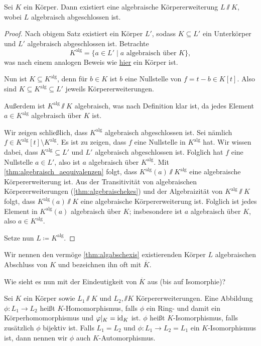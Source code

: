 \documentclass[12pt,a4paper]{scrartcl}
\begin{document}
\begin{satz}\label{thm:algabschexis}
	Sei $K$ ein Körper. Dann existiert eine algebraische Körpererweiterung $L\sslash K$, wobei $L$ algebraisch abgeschlossen ist.
\end{satz}
\begin{proof}
	Nach obigem Satz existiert ein Körper $L'$, sodass $K\subseteq L'$ ein Unterkörper und $L'$ algebraisch abgeschlossen ist. Betrachte
	\[K^{\text{alg}} = \{a\in L' \mid a\text{ algebraisch über } K\},\]
	was nach einem analogen Beweis wie \hyperref[enumi:IQalgkoerp]{hier} ein Körper ist.
	
	Nun ist $K\subseteq K^{\text{alg}}$, denn für $b\in K$ ist $b$ eine Nullstelle von $f = t-b\in K[t]$. Also sind $K\subseteq K^{\text{alg}}\subseteq L'$ jeweils Körpererweiterungen.
	
	Außerdem ist $K^{\text{alg}}\sslash K$ algebraisch, was nach Definition klar ist, da jedes Element $a\in K^{\text{alg}}$ algebraisch über $K$ ist.
	
	Wir zeigen schließlich, dass $K^{\text{alg}}$ algebraisch abgeschlossen ist. Sei nämlich $f\in K^{\text{alg}}[t]\setminus K^{\text{alg}}$. Es ist zu zeigen, dass $f$ eine Nullstelle in $K^{\text{alg}}$ hat. Wir wissen dabei, dass $K^{\text{alg}}\subseteq L'$ und $L'$ algebraisch abgeschlossen ist. Folglich hat $f$ eine Nullstelle $a\in L'$, also ist $a$ algebraisch über $K^{\text{alg}}$. Mit \cref{thm:algebraisch_aequivalenzen} folgt, dass $K^{\text{alg}}(a)\sslash K^{\text{alg}}$ eine algebraische Körpererweiterung ist. Aus der Transitivität von algebraischen Körpererweiterungen (\cref{thm:algebraischekes}) und der Algebraizität von $K^{\text{alg}}\sslash K$ folgt, dass $K^{\text{alg}}(a)\sslash K$  eine algebraische Körpererweiterung ist. Folglich ist jedes Element in $K^{\text{alg}}(a)$ algebraisch über $K$; insbesondere ist $a$ algebraisch über $K$, also $a\in K^{\text{alg}}$.
	
	Setze nun $L\coloneqq K^{\text{alg}}$.
\end{proof}

\begin{defi}
	Wir nennen den vermöge \cref{thm:algabschexis} existierenden Körper $L$ algebraischen Abschluss von $K$ und bezeichnen ihn oft mit $\overline{K}$.
\end{defi}
Wie sieht es nun mit der Eindeutigkeit von $\overline{K}$ aus (bis auf Isomorphie)?
\begin{defi}
	Sei $K$ ein Körper sowie $L_1\sslash K$ und $L_2, \sslash K$ Körpererweiterungen. Eine Abbildung $\phi\colon L_1\to L_2$ heißt $K$-Homomorphismus, falls $\phi$ ein Ring- und damit ein Körperhomomorphismus und $\varphi|_K = \operatorname{id}_K$ ist. $\phi$ heißt $K$-Isomorphismus, falls zusätzlich $\phi$ bijektiv ist. Falls $L_1 = L_2$ und $\phi\colon L_1\to L_2 = L_1$ ein $K$-Isomorphismus ist, dann nennen wir $\phi$ auch $K$-Automorphismus.
\end{defi}
\end{document}
